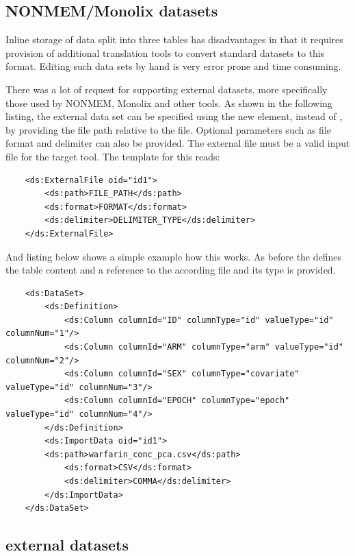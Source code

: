 \subsection{NONMEM/Monolix datasets}
\label{subsec:externalDataset}
Inline storage of data split into three tables has disadvantages in that 
it requires provision of additional translation tools to convert standard 
datasets to this format. Editing such data sets by hand is 
very error prone and time consuming.

There was a lot of request for supporting external datasets, more specifically
those used by NONMEM, Monolix and other tools. 
As shown in the following listing, the external data set can be specified using the 
new  element, instead of , by providing the file 
path relative to the \pml file. Optional parameters such as file format and 
delimiter can also be provided. The external file must be a valid input file for the target tool.
The template for this reads: 
\lstset{language=XML}
\begin{lstlisting}
    <ds:ExternalFile oid="id1">
        <ds:path>FILE_PATH</ds:path>
        <ds:format>FORMAT</ds:format>
        <ds:delimiter>DELIMITER_TYPE</ds:delimiter>
    </ds:ExternalFile>
    \end{lstlisting}
And listing below shows a simple example how this works. As before the 
defines the table content and a reference to the according file and its type is provided.
\lstset{language=XML}
\begin{lstlisting}
    <ds:DataSet>
        <ds:Definition>
            <ds:Column columnId="ID" columnType="id" valueType="id" columnNum="1"/>
            <ds:Column columnId="ARM" columnType="arm" valueType="id" columnNum="2"/>
            <ds:Column columnId="SEX" columnType="covariate" valueType="id" columnNum="3"/>
            <ds:Column columnId="EPOCH" columnType="epoch" valueType="id" columnNum="4"/>
        </ds:Definition>
    	<ds:ImportData oid="id1">
	    <ds:path>warfarin_conc_pca.csv</ds:path>
            <ds:format>CSV</ds:format>
            <ds:delimiter>COMMA</ds:delimiter>
        </ds:ImportData>
    </ds:DataSet>
\end{lstlisting}

\subsection{ external datasets}
\label{subsec:TrialDesignExternal}


